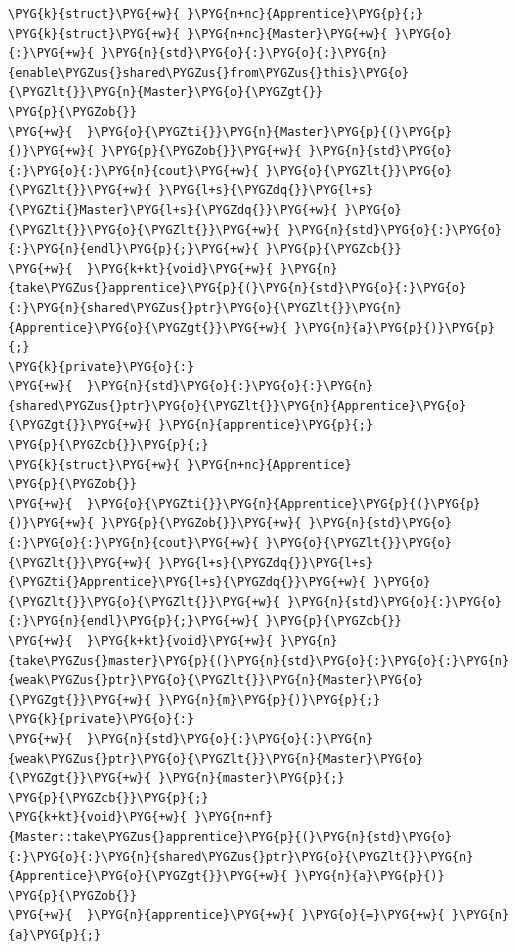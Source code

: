 \begin{itemize}
\begin{codeblockbg}
\begin{Verbatim}[commandchars=\\\{\},breaklines=true,breakanywhere=true,fontsize=\codefont,xleftmargin=17bp]
\PYG{k}{struct}\PYG{+w}{ }\PYG{n+nc}{Apprentice}\PYG{p}{;}
\PYG{k}{struct}\PYG{+w}{ }\PYG{n+nc}{Master}\PYG{+w}{ }\PYG{o}{:}\PYG{+w}{ }\PYG{n}{std}\PYG{o}{:}\PYG{o}{:}\PYG{n}{enable\PYGZus{}shared\PYGZus{}from\PYGZus{}this}\PYG{o}{\PYGZlt{}}\PYG{n}{Master}\PYG{o}{\PYGZgt{}}
\PYG{p}{\PYGZob{}}
\PYG{+w}{  }\PYG{o}{\PYGZti{}}\PYG{n}{Master}\PYG{p}{(}\PYG{p}{)}\PYG{+w}{ }\PYG{p}{\PYGZob{}}\PYG{+w}{ }\PYG{n}{std}\PYG{o}{:}\PYG{o}{:}\PYG{n}{cout}\PYG{+w}{ }\PYG{o}{\PYGZlt{}}\PYG{o}{\PYGZlt{}}\PYG{+w}{ }\PYG{l+s}{\PYGZdq{}}\PYG{l+s}{\PYGZti{}Master}\PYG{l+s}{\PYGZdq{}}\PYG{+w}{ }\PYG{o}{\PYGZlt{}}\PYG{o}{\PYGZlt{}}\PYG{+w}{ }\PYG{n}{std}\PYG{o}{:}\PYG{o}{:}\PYG{n}{endl}\PYG{p}{;}\PYG{+w}{ }\PYG{p}{\PYGZcb{}}
\PYG{+w}{  }\PYG{k+kt}{void}\PYG{+w}{ }\PYG{n}{take\PYGZus{}apprentice}\PYG{p}{(}\PYG{n}{std}\PYG{o}{:}\PYG{o}{:}\PYG{n}{shared\PYGZus{}ptr}\PYG{o}{\PYGZlt{}}\PYG{n}{Apprentice}\PYG{o}{\PYGZgt{}}\PYG{+w}{ }\PYG{n}{a}\PYG{p}{)}\PYG{p}{;}
\PYG{k}{private}\PYG{o}{:}
\PYG{+w}{  }\PYG{n}{std}\PYG{o}{:}\PYG{o}{:}\PYG{n}{shared\PYGZus{}ptr}\PYG{o}{\PYGZlt{}}\PYG{n}{Apprentice}\PYG{o}{\PYGZgt{}}\PYG{+w}{ }\PYG{n}{apprentice}\PYG{p}{;}
\PYG{p}{\PYGZcb{}}\PYG{p}{;}
\PYG{k}{struct}\PYG{+w}{ }\PYG{n+nc}{Apprentice}
\PYG{p}{\PYGZob{}}
\PYG{+w}{  }\PYG{o}{\PYGZti{}}\PYG{n}{Apprentice}\PYG{p}{(}\PYG{p}{)}\PYG{+w}{ }\PYG{p}{\PYGZob{}}\PYG{+w}{ }\PYG{n}{std}\PYG{o}{:}\PYG{o}{:}\PYG{n}{cout}\PYG{+w}{ }\PYG{o}{\PYGZlt{}}\PYG{o}{\PYGZlt{}}\PYG{+w}{ }\PYG{l+s}{\PYGZdq{}}\PYG{l+s}{\PYGZti{}Apprentice}\PYG{l+s}{\PYGZdq{}}\PYG{+w}{ }\PYG{o}{\PYGZlt{}}\PYG{o}{\PYGZlt{}}\PYG{+w}{ }\PYG{n}{std}\PYG{o}{:}\PYG{o}{:}\PYG{n}{endl}\PYG{p}{;}\PYG{+w}{ }\PYG{p}{\PYGZcb{}}
\PYG{+w}{  }\PYG{k+kt}{void}\PYG{+w}{ }\PYG{n}{take\PYGZus{}master}\PYG{p}{(}\PYG{n}{std}\PYG{o}{:}\PYG{o}{:}\PYG{n}{weak\PYGZus{}ptr}\PYG{o}{\PYGZlt{}}\PYG{n}{Master}\PYG{o}{\PYGZgt{}}\PYG{+w}{ }\PYG{n}{m}\PYG{p}{)}\PYG{p}{;}
\PYG{k}{private}\PYG{o}{:}
\PYG{+w}{  }\PYG{n}{std}\PYG{o}{:}\PYG{o}{:}\PYG{n}{weak\PYGZus{}ptr}\PYG{o}{\PYGZlt{}}\PYG{n}{Master}\PYG{o}{\PYGZgt{}}\PYG{+w}{ }\PYG{n}{master}\PYG{p}{;}
\PYG{p}{\PYGZcb{}}\PYG{p}{;}
\PYG{k+kt}{void}\PYG{+w}{ }\PYG{n+nf}{Master::take\PYGZus{}apprentice}\PYG{p}{(}\PYG{n}{std}\PYG{o}{:}\PYG{o}{:}\PYG{n}{shared\PYGZus{}ptr}\PYG{o}{\PYGZlt{}}\PYG{n}{Apprentice}\PYG{o}{\PYGZgt{}}\PYG{+w}{ }\PYG{n}{a}\PYG{p}{)}
\PYG{p}{\PYGZob{}}
\PYG{+w}{  }\PYG{n}{apprentice}\PYG{+w}{ }\PYG{o}{=}\PYG{+w}{ }\PYG{n}{a}\PYG{p}{;}

\end{Verbatim}
\end{codeblockbg}
\end{itemize}
